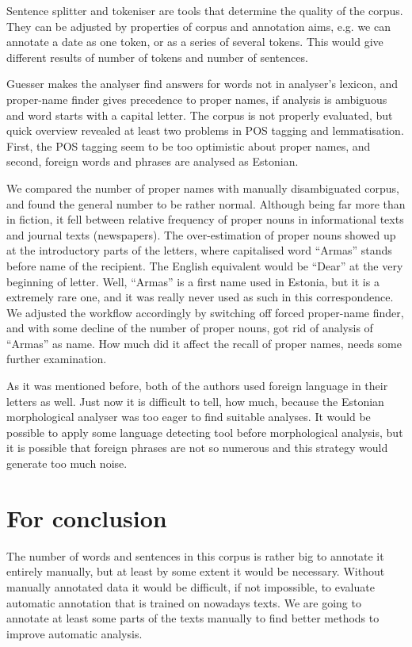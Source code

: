 \documentclass[runningheads]{llncs}
\begin{document}
Sentence splitter and tokeniser are tools that determine the quality of the corpus.
They can be adjusted by properties of corpus and annotation aims, e.g. we can annotate a date as one token, or as a series of several tokens.  This would give different results of number of tokens and number of sentences.


Guesser makes the analyser find answers for words not in analyser's lexicon, and proper-name finder gives precedence to proper names, if analysis is ambiguous and word starts with a capital letter.  The corpus is not properly evaluated, but quick overview revealed at least two problems in POS tagging and lemmatisation.  First, the POS tagging seem to be too optimistic about proper names, and second, foreign words and phrases are analysed as Estonian.

We compared the number of proper names with manually disambiguated corpus, and found the general number to be rather normal.  Although being far more than in fiction, it fell between relative frequency of proper nouns in informational texts and journal texts (newspapers).  The over-estimation of proper nouns showed up at the introductory parts of the letters, where capitalised word ``Armas'' stands before name of the recipient.  The English equivalent would be ``Dear'' at the very beginning of letter.  Well, ``Armas'' is a first name used in Estonia, but it is a extremely rare one, and it was really never used as such in this correspondence.  We adjusted the workflow accordingly by switching off forced proper-name finder, and with some decline of the number of proper nouns, got rid of analysis of ``Armas'' as name.  How much did it affect the recall of proper names, needs some further examination.

As it was mentioned before, both of the authors used foreign language in their letters as well.  Just now it is difficult to tell, how much, because the Estonian morphological analyser was too eager to find suitable analyses.  It would be possible to apply some language detecting tool before morphological analysis, but it is possible that foreign phrases are not so numerous and this strategy would generate too much noise.


\section{For conclusion}

The number of words and sentences in this corpus is rather big to annotate it entirely manually, but at least by some extent it would be necessary.  Without manually annotated data it would be difficult, if not impossible, to evaluate automatic annotation that is trained on nowadays texts.  We are going to annotate at least some parts of the texts manually to find better methods to improve automatic analysis.
\end{document}
